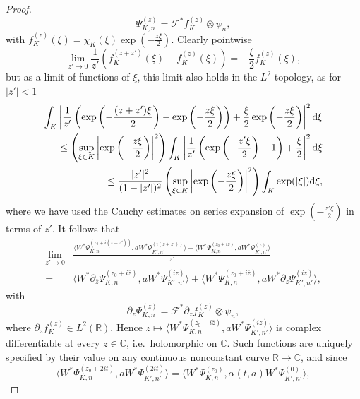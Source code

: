 \documentclass[sn-mathphys-num]{sn-jnl}%
\newcommand{\CC}{\mathbb{C}}
\newcommand{\RR}{\mathbb{R}}
\newcommand{\diff}{\textup{d}}
\numberwithin{equation}{section}
\theoremstyle{thmstyleone}%
\theoremstyle{thmstyletwo}%
\theoremstyle{thmstylethree}%
\begin{document}
\begin{proof}
\begin{equation}
    \Psi_{K,n}^{(z)}=\mathcal{F}^*f_K^{(z)}\otimes\psi_n,
\end{equation}
with $f_K^{(z)}(\xi)=\chi_K(\xi)\exp(-\frac{z\xi}{2})$.
Clearly pointwise \begin{equation}
    \lim_{z'\to 0}\frac{1}{z'}\left(f_K^{(z+z')}(\xi)-f_K^{(z)}(\xi)\right)=-\frac{\xi}{2}f_K^{(z)}(\xi),
\end{equation} but as a limit of functions of $\xi$, this limit also holds in the $L^2$ topology, as for $\vert z'\vert<1$
\begin{align}
    \int_K \left\vert\frac{1}{z'}\left(\exp\left(-\frac{(z+z')\xi}{2}\right)-\exp\left(-\frac{z\xi}{2}\right)\right)+\frac{\xi}{2}\exp\left(-\frac{z\xi}{2}\right)\right\vert^2\diff\xi\\
    \leq\left(\sup_{\xi\in K}\left\vert\exp\left(-\frac{z\xi}{2}\right)\right\vert^2\right)\int_K \left\vert\frac{1}{z'}\left(\exp\left(-\frac{z'\xi}{2}\right)-1\right)+\frac{\xi}{2}\right\vert^2\diff\xi\nonumber\\
    \leq\frac{\vert z'\vert^2}{(1-\vert z'\vert)^2}\left(\sup_{\xi\in K}\left\vert\exp\left(-\frac{z\xi}{2}\right)\right\vert^2\right)\int_K \exp(\vert\xi\vert)\diff\xi,
\end{align}
where we have used the Cauchy estimates on series expansion of $\exp\left(-\frac{z'\xi}{2}\right)$ in terms of $z'$. It follows that 
\begin{align}
    \lim_{z'\to 0}&\frac{\langle W^*\Psi_{K,n}^{(z_0+i(\overline{z+z'}))}, a W^*\Psi_{K',n'}^{(i(z+z'))}\rangle-\langle W^*\Psi_{K,n}^{(z_0+i\overline{z})}, a W^*\Psi_{K',n'}^{(z)}\rangle}{z'}\nonumber\\
    =&\langle W^*\partial_{\overline{z}}\Psi_{K,n}^{(z_0+i\overline{z})}, a W^*\Psi_{K',n'}^{(iz)}\rangle+\langle W^*\Psi_{K,n}^{(z_0+i\overline{z})}, a W^*\partial_{z}\Psi_{K',n'}^{(iz)}\rangle,
\end{align}
with 
\begin{equation}
    \partial_z\Psi_{K,n}^{(z)}=\mathcal{F}^*\partial_zf_K^{(z)}\otimes\psi_n,
\end{equation}
where $\partial_zf_K^{(z)}\in L^2(\RR)$. Hence $z\mapsto \langle W^*\Psi_{K,n}^{(z_0+i\overline{z})}, a W^*\Psi_{K',n'}^{(iz)}\rangle$ is complex differentiable at every $z\in \CC$, i.e.\ holomorphic on $\CC$. Such functions are uniquely specified by their value on any continuous nonconstant curve $\RR\to \CC$, and since 
\begin{equation}
    \langle W^*\Psi_{K,n}^{(z_0+2it)}, a W^*\Psi_{K',n'}^{(2it)}\rangle=\langle W^*\Psi_{K,n}^{(z_0)}, \alpha(t,a) W^*\Psi_{K',n'}^{(0)}\rangle,

\end{equation}
\end{proof}
\end{document}
